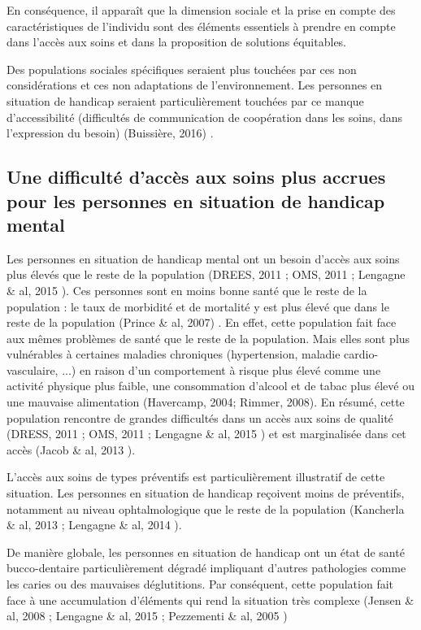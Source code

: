En conséquence, il apparaît que la dimension sociale et la prise en compte des caractéristiques de l'individu sont des éléments essentiels à prendre en compte dans l'accès aux soins et dans la proposition de solutions équitables.

Des populations sociales spécifiques seraient plus touchées par ces non considérations et ces non adaptations de l'environnement. Les personnes en situation de handicap seraient particulièrement touchées par ce manque d'accessibilité (difficultés de communication de coopération dans les soins, dans l'expression du besoin) (Buissière, 2016) \cite {Bussiere2016}.

\subsection{Une difficulté d'accès aux soins plus accrues pour les personnes en situation de handicap mental}

Les personnes en situation de handicap mental ont un besoin d'accès aux soins plus élevés que le reste de la population (DREES, 2011 \cite{DREES2011}; OMS, 2011 \cite{OMS2011}; Lengagne \& al, 2015 \cite{Lengagne2015}). Ces personnes sont en moins bonne santé que le reste de la population : le taux de morbidité et de mortalité y est plus élevé que dans le reste de la population (Prince \& al, 2007) \cite{Prince2007}. En effet, cette population fait face aux mêmes problèmes de santé que le reste de la population. Mais elles sont plus vulnérables à certaines maladies chroniques (hypertension, maladie cardio-vasculaire, ...) en raison d'un comportement à risque plus élevé comme une activité physique plus faible, une consommation d'alcool et de tabac plus élevé ou une mauvaise alimentation (Havercamp, 2004; Rimmer, 2008). En résumé, cette population rencontre de grandes difficultés dans un accès aux soins de qualité (DRESS, 2011 \cite{DREES2011}; OMS, 2011 \cite{OMS2011}; Lengagne \& al, 2015 \cite{Lengagne2015}) et est marginalisée dans cet accès (Jacob \& al, 2013 \cite{Jacob2013}).

L'accès aux soins de types préventifs est particulièrement illustratif de cette situation. Les personnes en situation de handicap reçoivent moins de préventifs, notamment au niveau ophtalmologique que le reste de la population (Kancherla \& al, 2013 \cite{Kancherla2013}; Lengagne \& al, 2014 \cite{Lengagne2014}). 

De manière globale, les personnes en situation de handicap ont un état de santé bucco-dentaire particulièrement dégradé impliquant d'autres pathologies comme les caries ou des mauvaises déglutitions. Par conséquent, cette population fait face à une accumulation d'éléments qui rend la situation très complexe (Jensen \& al, 2008 \cite{Jensen2008}; Lengagne \& al, 2015 \cite{Lengagne2015}; Pezzementi \& al, 2005 \cite{Pezzementi2005})

